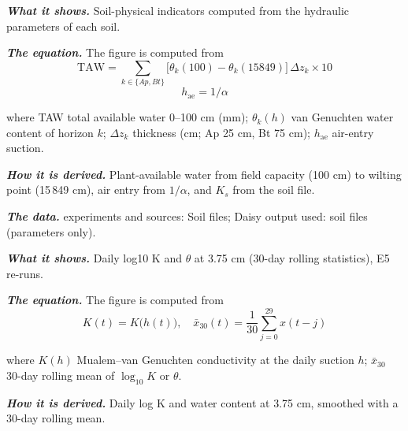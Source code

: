 \label{fig:a19_9}
\par\noindent\textbf{\color{khmag}\emph{What it shows.}} Soil-physical indicators computed from the hydraulic parameters of each soil.
\par\noindent\textbf{\color{khmag}\emph{The equation.}} The figure is computed from
\begin{equation}\boxed{\mathrm{TAW}=\sum_{k\in\{Ap,Bt\}}\bigl[\theta_k(100)-\theta_k(15849)\bigr]\,\Delta z_k\times10}\end{equation}
\begin{equation}\boxed{h_{\mathrm{ae}}=1/\alpha}\end{equation}
\par\noindent where TAW total available water 0--100 cm (mm); $\theta_k(h)$ van Genuchten water content of horizon $k$; $\Delta z_k$ thickness (cm; Ap 25 cm, Bt 75 cm); $h_{\mathrm{ae}}$ air-entry suction.
\par\noindent\textbf{\color{khmag}\emph{How it is derived.}} Plant-available water from field capacity (100 cm) to wilting point (15\,849 cm), air entry from $1/\alpha$, and $K_s$ from the soil file.
\par\noindent\textbf{\color{khmag}\emph{The data.}} experiments and sources: Soil files; Daisy output used: soil files (parameters only).
\par\vspace{6pt}\noindent{}\par\nobreak
{}\label{fig:a19_10}
\par\noindent\textbf{\color{khmag}\emph{What it shows.}} Daily log10 K and $\theta$ at 3.75 cm (30-day rolling statistics), E5 re-runs.
\par\noindent\textbf{\color{khmag}\emph{The equation.}} The figure is computed from
\begin{equation}\boxed{K(t)=K\bigl(h(t)\bigr),\quad \bar x_{30}(t)=\dfrac1{30}\sum_{j=0}^{29}x(t-j)}\end{equation}
\par\noindent where $K(h)$ Mualem--van Genuchten conductivity at the daily suction $h$; $\bar x_{30}$ 30-day rolling mean of $\log_{10}K$ or $\theta$.
\par\noindent\textbf{\color{khmag}\emph{How it is derived.}} Daily log K and water content at 3.75 cm, smoothed with a 30-day rolling mean.
